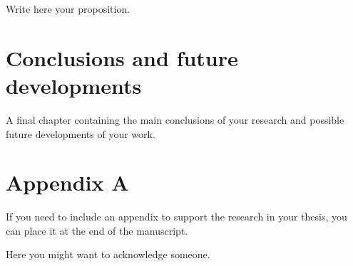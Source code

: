 \documentclass[university=polimi, master, format=classic, language=english]{academicthesis}
\begin{document}
\begin{proposition}
  Write here your proposition.
\end{proposition}

\chapter{Conclusions and future developments}
A final chapter containing the main conclusions of your research and
possible future developments of your work.


\appendix
\chapter{Appendix A}
If you need to include an appendix to support the research in your
thesis, you can place it at the end of the manuscript.

\backmatter
\listoffigures
\listoftables

\begin{acknowledgements}
  Here you might want to acknowledge someone.
\end{acknowledgements}
\end{document}
